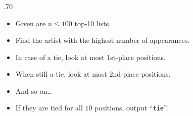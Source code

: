 \begin{frame}
    \frametitle{\problemtitle}

    \begin{columns}
        \begin{column}[T]{.70\textwidth}
            \begin{itemize}
                \item Given are $n \leq 100$ top-10 lists.
                \item Find the artist with the highest number of appearances.
                \item In case of a tie, look at most 1st-place positions.
                \item When still a tie, look at most 2nd-place positions.
                \item And so on\ldots
                \item If they are tied for all $10$ positions, output ``\texttt{tie}''.
            \end{itemize}



        \end{column}


    \end{columns}
\end{frame}
